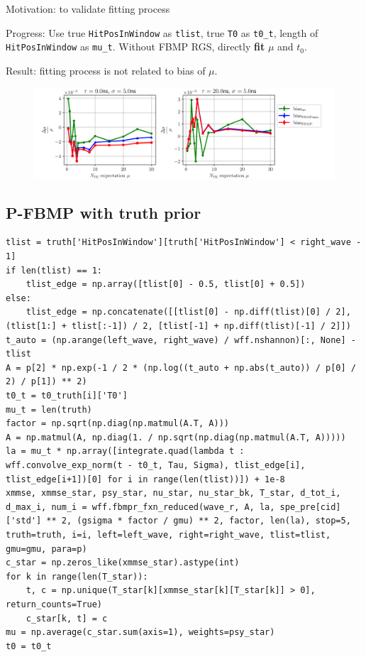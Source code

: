 \documentclass[notitlepage]{article}
\begin{document}
Motivation: to validate fitting process

Progress: Use true \texttt{HitPosInWindow} as \texttt{tlist}, true \texttt{T0} as \texttt{t0\_t}, length of \texttt{HitPosInWindow} as \texttt{mu\_t}. Without FBMP RGS, directly \textbf{fit} $\mu$ and $t_0$. 

Result: fitting process is not related to bias of $\mu$. 

\begin{figure}[H]
    \includegraphics[width=\textwidth]{vs-biasmu-trufit.png}
\end{figure}

\subsection{P-FBMP with truth prior}

\begin{lstlisting}
tlist = truth['HitPosInWindow'][truth['HitPosInWindow'] < right_wave - 1]
if len(tlist) == 1:
    tlist_edge = np.array([tlist[0] - 0.5, tlist[0] + 0.5])
else:
    tlist_edge = np.concatenate([[tlist[0] - np.diff(tlist)[0] / 2], (tlist[1:] + tlist[:-1]) / 2, [tlist[-1] + np.diff(tlist)[-1] / 2]])
t_auto = (np.arange(left_wave, right_wave) / wff.nshannon)[:, None] - tlist
A = p[2] * np.exp(-1 / 2 * (np.log((t_auto + np.abs(t_auto)) / p[0] / 2) / p[1]) ** 2)
t0_t = t0_truth[i]['T0']
mu_t = len(truth)
factor = np.sqrt(np.diag(np.matmul(A.T, A)))
A = np.matmul(A, np.diag(1. / np.sqrt(np.diag(np.matmul(A.T, A)))))
la = mu_t * np.array([integrate.quad(lambda t : wff.convolve_exp_norm(t - t0_t, Tau, Sigma), tlist_edge[i], tlist_edge[i+1])[0] for i in range(len(tlist))]) + 1e-8
xmmse, xmmse_star, psy_star, nu_star, nu_star_bk, T_star, d_tot_i, d_max_i, num_i = wff.fbmpr_fxn_reduced(wave_r, A, la, spe_pre[cid]['std'] ** 2, (gsigma * factor / gmu) ** 2, factor, len(la), stop=5, truth=truth, i=i, left=left_wave, right=right_wave, tlist=tlist, gmu=gmu, para=p)
c_star = np.zeros_like(xmmse_star).astype(int)
for k in range(len(T_star)):
    t, c = np.unique(T_star[k][xmmse_star[k][T_star[k]] > 0], return_counts=True)
    c_star[k, t] = c
mu = np.average(c_star.sum(axis=1), weights=psy_star)
t0 = t0_t
\end{lstlisting}
\end{document}
